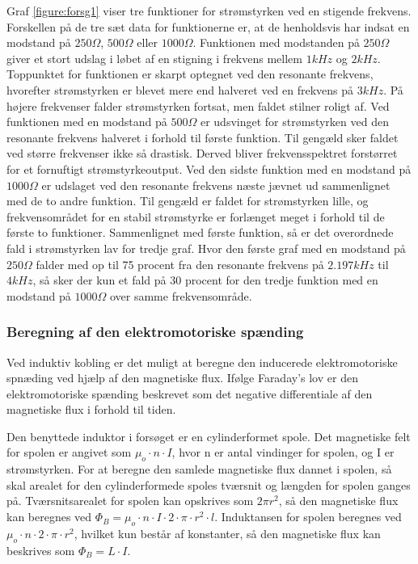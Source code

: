 Graf \ref{figure:forsg1} viser tre funktioner for strømstyrken ved en stigende frekvens. Forskellen på de tre sæt data for funktionerne er, at de henholdsvis har indsat en modstand på $250 \Omega$, $500 \Omega$ eller $1000 \Omega$. Funktionen med modstanden på $250 \Omega$ giver et stort udslag i løbet af en stigning i frekvens mellem $1 kHz$ og $2 kHz$. Toppunktet for funktionen er skarpt optegnet ved den resonante frekvens, hvorefter strømstyrken er blevet mere end halveret ved en frekvens på $3 kHz$. På højere frekvenser falder strømstyrken fortsat, men faldet stilner roligt af. Ved funktionen med en modstand på $500 \Omega$ er udsvinget for strømstyrken ved den resonante frekvens halveret i forhold til første funktion. Til gengæld sker faldet ved større frekvenser ikke så drastisk. Derved bliver frekvensspektret forstørret for et fornuftigt strømstyrkeoutput. Ved den sidste funktion med en modstand på $1000 \Omega$ er udslaget ved den resonante frekvens næste jævnet ud sammenlignet med de to andre funktion. Til gengæld er faldet for strømstyrken lille, og frekvensområdet for en stabil strømstyrke er forlænget meget i forhold til de første to funktioner. Sammenlignet med første funktion, så er det overordnede fald i strømstyrken lav for tredje graf. Hvor den første graf med en modstand på $250 \Omega$ falder med op til 75 procent fra den resonante frekvens på $2.197 kHz$ til $4 kHz$, så sker der kun et fald på 30 procent for den tredje funktion med en modstand på $1000 \Omega$ over samme frekvensområde.

\subsubsection{Beregning af den elektromotoriske spænding}

Ved induktiv kobling er det muligt at beregne den inducerede elektromotoriske spnæding ved hjælp af den magnetiske flux. Ifølge Faraday's lov er den elektromotoriske spænding beskrevet som det negative differentiale af den magnetiske flux i forhold til tiden.

Den benyttede induktor i forsøget er en cylinderformet spole. Det magnetiske felt for spolen er angivet som $\mu_o \cdot n \cdot I$, hvor n er antal vindinger for spolen, og I er strømstyrken. For at beregne den samlede magnetiske flux dannet i spolen, så skal arealet for den cylinderformede spoles tværsnit og længden for spolen ganges på. Tværsnitsarealet for spolen kan opskrives som $2 \pi r^2$, så den magnetiske flux kan beregnes ved $\Phi_B = \mu_o \cdot n \cdot I \cdot 2 \cdot \pi \cdot r^2 \cdot l$. Induktansen for spolen beregnes ved $\mu_o \cdot n \cdot 2 \cdot \pi \cdot r^2$, hvilket kun består af konstanter, så den magnetiske flux kan beskrives som $\Phi_B = L \cdot I$.

